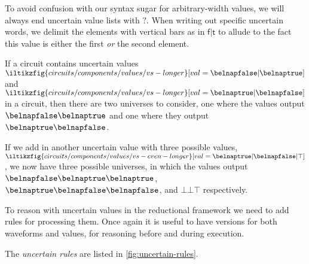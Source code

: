 To avoid confusion with our syntax sugar for arbitrary-width values, we will
always end uncertain value lists with \(?\).
When writing out specific uncertain words, we delimit the elements with vertical
bars as in \(\mathsf{f}|\mathsf{t}\) to allude to the fact this value is either
the first \emph{or} the second element.

\begin{example}
    If a circuit contains uncertain values \(
    \iltikzfig{circuits/components/values/vs-longer}[val=\belnapfalse|\belnaptrue]
    \) and \(
    \iltikzfig{circuits/components/values/vs-longer}[val=\belnaptrue|\belnapfalse]
    \) in a circuit, then there are two universes to consider, one where the
    values output \(\belnapfalse\belnaptrue\) and one where they output
    \(\belnaptrue\belnapfalse\).

    If we add in another uncertain value with three possible values, \(
    \iltikzfig{circuits/components/values/vs-even-longer}[val=\belnaptrue|\belnapfalse|\top]
    \), we now have three possible universes, in which the values output
    \(\belnapfalse\belnaptrue\belnaptrue\),
    \(\belnaptrue\belnapfalse\belnapfalse\), and
    \(\bot\bot\top\) respectively.
\end{example}

To reason with uncertain values in the reductional framework we need to add
rules for processing them.
Once again it is useful to have versions for both waveforms and values, for
reasoning before and during execution.

\begin{definition}
    The \emph{uncertain rules} are listed in \cref{fig:uncertain-rules}.
\end{definition}



